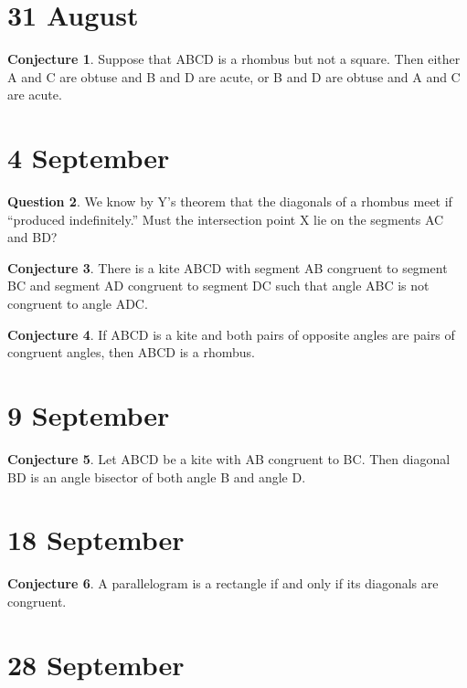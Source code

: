 \documentclass{amsart}
\theoremstyle{definition}
\newtheorem{conjecture}{Conjecture}
\newtheorem{question}[conjecture]{Question}
\begin{document}
\section*{31 August}

\begin{conjecture} 
Suppose that ABCD is a rhombus but not a square. Then
either A and C are obtuse and B and D are acute, or B and D are obtuse and A and C are acute.
\end{conjecture}

\section*{4 September}

\begin{question} 
We know by Y's theorem that the diagonals of a rhombus
meet if ``produced indefinitely.'' Must the intersection point X lie on the segments AC and BD?
\end{question}

\begin{conjecture} 
There is a kite ABCD with segment AB congruent to
segment BC and segment AD congruent to segment DC such that 
angle ABC is not congruent to angle ADC.
\end{conjecture}

\begin{conjecture} If ABCD is a kite and both pairs of opposite angles are pairs of congruent angles, then ABCD is a rhombus.
\end{conjecture}

\section*{9 September}

\begin{conjecture}
Let ABCD be a kite with AB congruent to BC. Then
diagonal BD is an angle bisector of both angle B and angle D.
\end{conjecture}

\section*{18 September}

\begin{conjecture} A parallelogram is a rectangle if and only if its diagonals are congruent.
\end{conjecture}

\section*{28 September}
\end{document}
